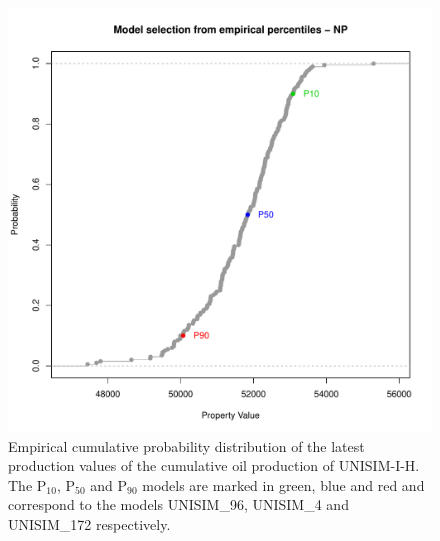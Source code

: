 \documentclass[final,5p,times,twocolumn]{elsarticle}
\begin{document}
\begin{figure}[H]
  \centering
  \includegraphics[width=\columnwidth]{ecdf-NP.pdf}
  \caption{Empirical cumulative probability distribution of the latest production values of the cumulative oil production of UNISIM-I-H. The P$_{10}$, P$_{50}$ and P$_{90}$ models are marked in green, blue and red and correspond to the models UNISIM\_96, UNISIM\_4 and UNISIM\_172 respectively.}
  \label{fig:ecdf-NP}
\end{figure}
\end{document}
